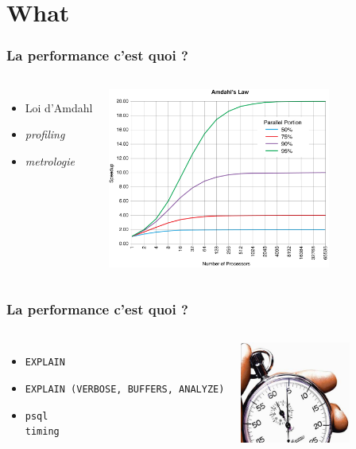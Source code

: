 \documentclass{beamer}
\begin{document}
\section{What}

\begin{frame}
  \frametitle{La performance c'est quoi ?}

  \vfill

\begin{columns}[c]

  \begin{itemize}
  \item Loi d'Amdahl
  \item \textit{profiling}
  \item \textit{metrologie}
  \end{itemize}

\begin{center}
  \includegraphics[height=16em]{amdahlslaw.png}
\end{center}
\end{columns}
\end{frame}

\begin{frame}
  \frametitle{La performance c'est quoi ?}

  \vfill

\begin{columns}[c]

  \begin{itemize}
  \item \texttt{EXPLAIN}
  \item \texttt{EXPLAIN (VERBOSE, BUFFERS, ANALYZE)}
  \item \texttt{psql \\timing}
  \end{itemize}

\begin{center}
  \includegraphics[height=9em]{timing.jpg}
\end{center}
\end{columns}
\end{frame}
\end{document}
